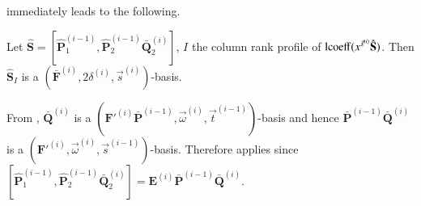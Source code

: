  immediately leads
to the following. 
\begin{lem}
\label{lem:computationAtTopLevel}Let $\hat{\mathbf{S}}=[\hat{\mathbf{P}}_{1}^{\left(i-1\right)},\hat{\mathbf{P}}_{2}^{\left(i-1\right)}\bar{\mathbf{Q}}_{2}^{\left(i\right)}]$,
$I$ the column rank profile of $\operatorname{lcoeff}(x^{\vec{s}^{\left(i\right)}}\hat{\mathbf{S}})$.
Then $\hat{\mathbf{S}}_{I}$ is a $(\bar{\mathbf{F}}^{\left(i\right)},2\delta^{\left(i\right)},\vec{s}^{\left(i\right)})$-basis.\end{lem}
\begin{pf}
From , $\bar{\mathbf{Q}}^{\left(i\right)}$
is a $(\mathbf{F}'^{\left(i\right)}\bar{\mathbf{P}}^{\left(i-1\right)},\vec{\omega}^{\left(i\right)},\vec{t}^{\left(i-1\right)})$-basis
and hence $\bar{\mathbf{P}}^{\left(i-1\right)}\bar{\mathbf{Q}}^{\left(i\right)}$
is a $(\mathbf{F}'^{\left(i\right)},\vec{\omega}^{\left(i\right)},\vec{s}^{\left(i-1\right)})$-basis.
Therefore  applies since $[\hat{\mathbf{P}}_{1}^{\left(i-1\right)},\hat{\mathbf{P}}_{2}^{\left(i-1\right)}\bar{\mathbf{Q}}_{2}^{\left(i\right)}]=\mathbf{E}^{\left(i\right)}\bar{\mathbf{P}}^{\left(i-1\right)}\bar{\mathbf{Q}}^{\left(i\right)}$.
%
\begin{comment}
$=\mathbf{E}^{\left(i\right)}[\bar{\mathbf{P}}_{1}^{\left(i-1\right)},\bar{\mathbf{P}}_{2}^{\left(i-1\right)}\bar{\mathbf{Q}}_{2}^{\left(i\right)}]$ 
\end{comment}
{}\end{pf}
